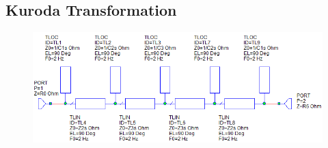 \subsection{Kuroda Transformation}

\begin{figure}
    \centering
    \includegraphics[width=\imagewidth]{images/stripline-kuroda}
    \caption{}
\end{figure}


